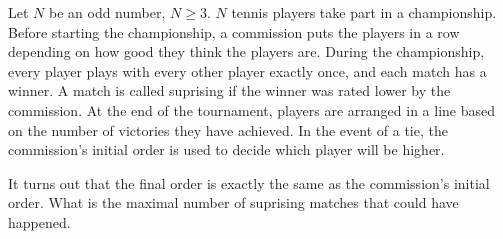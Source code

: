 Let $N$ be an odd number, $N\geq 3$. $N$ tennis players take part in a championship. Before starting the championship, a commission puts the players in a row depending on how good they think the players are. During the championship, every player plays with every other player exactly once, and each match has a winner. A match is called suprising if the winner was rated lower by the commission. At the end of the tournament, players are arranged in a line based on the number of victories they have achieved. In the event of a tie, the commission's initial order is used to decide which player will be higher.

It turns out that the final order is exactly the same as the commission's initial order. What is the maximal number of suprising matches that could have happened.